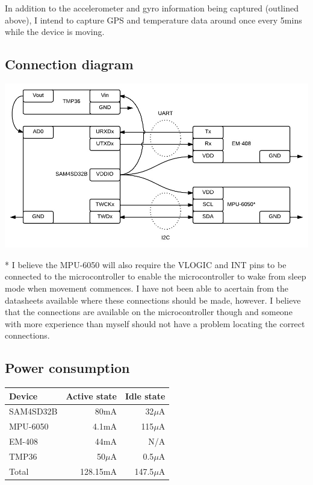 \documentclass[a4paper, twoside]{article}
\begin{document}
In addition to the accelerometer and gyro information being captured (outlined
above), I intend to capture GPS and temperature data around once every 5mins while the device is
moving.

\clearpage
\subsection{Connection diagram}
\begin{center}
\includegraphics[scale=0.45]{images/connectiondiagram.jpeg}
\end{center}
* I believe the MPU-6050 will also require the VLOGIC and INT pins to be
connected to the microcontroller to enable the microcontroller to wake from
sleep mode when movement commences. I have not been able to acertain from the
datasheets available where these connections should be made, however. I believe
that the connections are available on the microcontroller though and someone
with more experience than myself should not have a problem locating the correct
connections.

\subsection{Power consumption}

\begin{tabular}{|l|r|r|}
	\hline
	\textbf{Device} & \textbf{Active state} & \textbf{Idle state} \\
	\hline
	\hline
	SAM4SD32B & 80mA & 32$\mu$A \\
	MPU-6050 & 4.1mA & 115$\mu$A \\
	EM-408 & 44mA & N/A \\
	TMP36 & 50$\mu$A & 0.5$\mu$A \\
	\hline
	\hline
	Total & 128.15mA & 147.5$\mu$A \\
	\hline
\end{tabular}
\vspace{20pt}
\end{document}
